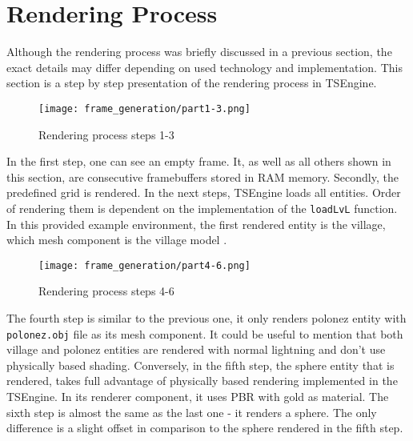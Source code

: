 \newpage
\section{Rendering Process}
\hspace{\parindent}
Although the rendering process was briefly discussed in a previous section, the exact details may differ depending on used technology and implementation. This section is a step by step presentation of the rendering process in TSEngine.\\
\begin{figure}[H]
  \texttt{[image: frame\_generation/part1-3.png]}
  \caption{Rendering process steps 1-3}
\end{figure}
In the first step, one can see an empty frame. It, as well as all others shown in this section, are consecutive framebuffers stored in RAM memory.
Secondly, the predefined grid is rendered.
In the next steps, TSEngine loads all entities. Order of rendering them is dependent on the implementation of the \texttt{loadLvL} function. In this provided example environment, the first rendered entity is the village, which mesh component is the village model \cite{VillageModel}.

\begin{figure}[H]
  \texttt{[image: frame\_generation/part4-6.png]}
  \caption{Rendering process steps 4-6}
\end{figure}
The fourth step is similar to the previous one, it only renders polonez entity with \texttt{polonez.obj} file as its mesh component. It could be useful to mention that both village and polonez entities are rendered with normal lightning and don't use physically based shading.
Conversely, in the fifth step, the sphere entity that is rendered, takes full advantage of physically based rendering implemented in the TSEngine. In its renderer component, it uses PBR with gold as material. 
The sixth step is almost the same as the last one - it renders a sphere. The only difference is a slight offset in comparison to the sphere rendered in the fifth step.

